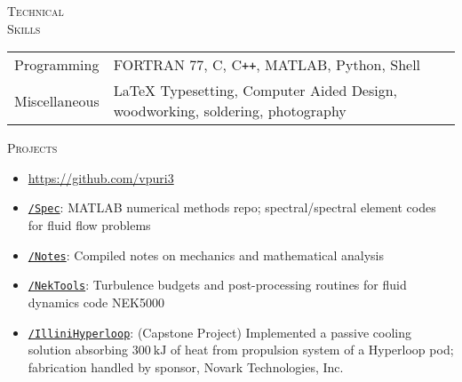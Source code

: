 \documentclass[10pt]{article}
\begin{document}
\vspace{-1.5em}
\begin{multicols}{2}
\textsc{\small Technical \\ Skills}
\columnbreak

\begin {table}[H]
\begin{tabular}{l l }
\hspace{-0.5em}Programming   & \hspace{-0.0em} FORTRAN 77, C, C\texttt{++}, MATLAB, Python, Shell\\
\hspace{-0.5em}Miscellaneous & \hspace{-0.0em} \LaTeX{} Typesetting, Computer Aided Design, woodworking, soldering, photography \\
\end{tabular}	
\end{table}

\end{multicols}
\vspace{-1.5em}
\begin{multicols}{2}
\textsc{\small Projects}
\columnbreak

\vspace{-1.75em}
\begin{itemize}[label=-]
    \setlength{\itemindent}{-1.75em}
    \setlength\itemsep{-0.25em}
    \item[]\hspace{-1.0em} \url{https://github.com/vpuri3}
    \item \href{https://github.com/vpuri3/Spec}{\texttt{/Spec}}: MATLAB numerical methods repo; spectral/spectral element codes for fluid flow problems
    \item \href{https://github.com/vpuri3/Notes}{\texttt{/Notes}}: Compiled notes on mechanics and mathematical analysis
    \item \href{https://github.com/vpuri3/NekTools}{\texttt{/NekTools}}: Turbulence budgets and post-processing routines for fluid dynamics code NEK5000
    \item \href{https://github.com/vpuri3/IlliniHyperloop}{\texttt{/IlliniHyperloop}}: (Capstone Project) Implemented a passive cooling solution absorbing $\SI{300}{\kilo \joule}$ of heat from propulsion system of a Hyperloop pod; fabrication handled by sponsor, Novark Technologies, Inc.
\end{itemize}
\vspace{-2.0em}

\end{multicols}
\vspace{-1.5em}
\vfill
\end{document}
